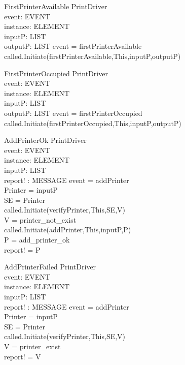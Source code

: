 \begin{schema}{FirstPrinterAvailable}
\Delta PrintDriver \\
event: EVENT \\
instance: ELEMENT \\
inputP: LIST \\
outputP: LIST
\where event = firstPrinterAvailable \\
called.Initiate(firstPrinterAvailable,This,inputP,outputP)
\end{schema}

\begin{schema}{FirstPrinterOccupied}
\Delta PrintDriver \\
event: EVENT \\
instance: ELEMENT \\
inputP: LIST \\
outputP: LIST
\where event = firstPrinterOccupied \\
called.Initiate(firstPrinterOccupied,This,inputP,outputP)
\end{schema}


\begin{schema}{AddPrinterOk}
\Delta PrintDriver \\
event: EVENT \\
instance: ELEMENT \\
inputP: LIST \\
report! : MESSAGE
\where event = addPrinter \\
Printer = \head inputP \\
SE = \lseq Printer \rseq \\
called.Initiate(verifyPrinter,This,SE,V) \\
V = printer\_not\_exist \\
called.Initiate(addPrinter,This,inputP,P) \\
P = add\_printer\_ok \\
report! = P
\end{schema}

\begin{schema}{AddPrinterFailed}
\Delta PrintDriver \\
event: EVENT \\
instance: ELEMENT \\
inputP: LIST \\
report! : MESSAGE
\where event = addPrinter \\
Printer = \head inputP \\
SE = \lseq Printer \rseq \\
called.Initiate(verifyPrinter,This,SE,V) \\
V = printer\_exist \\
report! = V
\end{schema}


